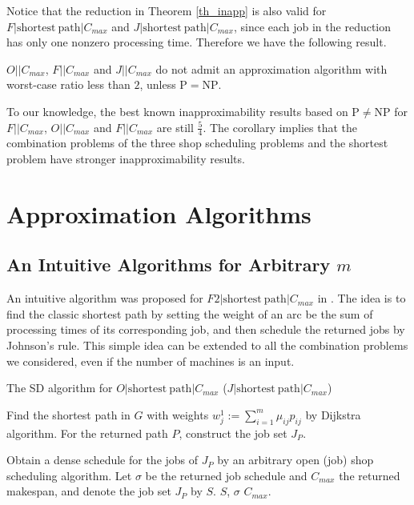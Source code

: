 \documentclass{llncs}
\numberwithin{subcase}{case}
\begin{document}
Notice that the reduction in Theorem \ref{th_inapp} is also valid for $F|\mathrm{shortest}~\mathrm{path}|C_{max}$ and $J|\mathrm{shortest}~\mathrm{path}|C_{max}$, since each job in the reduction has only one nonzero processing time. Therefore we have the following result.
\begin{corollary}
$O||C_{max}$, $F||C_{max}$ and $J||C_{max}$ do not admit an approximation algorithm with worst-case ratio less than $2$, unless $\mathrm{P}=\mathrm{NP}$.
\end{corollary}

To our knowledge, the best known inapproximability results based on $\mathrm{P}\neq\mathrm{NP}$ for $F||C_{max}$, $O||C_{max}$ and $F||C_{max}$ are still $\frac{5}{4}$. The corollary implies that the combination problems of the three shop scheduling problems and the shortest problem have stronger inapproximability results.

\section{Approximation Algorithms}\label{sec_approx}
\subsection{An Intuitive Algorithms for Arbitrary $m$}\label{sec_alg_nat}
An intuitive algorithm was proposed for $F2|\mathrm{shortest}~\mathrm{path}|C_{max}$ in \cite{NW13}. The idea is to find the classic shortest path by setting the weight of an arc be the sum of processing times of its corresponding job, and then schedule the returned jobs by Johnson's rule. This simple idea can be extended to all the combination problems we considered, even if the number of machines is an input.

\begin{algorithm}[htb]
\caption{The SD algorithm for {\small$O|\mathrm{shortest}~\mathrm{path}|C_{max}$ ($J|\mathrm{shortest}~\mathrm{path}|C_{max}$)}}
\label{alg_1}
\begin{algorithmic}[1]
\STATE Find the shortest path in $G$ with weights $w^1_j := \sum^m_{i = 1}\mu_{ij}p_{ij}$ by Dijkstra algorithm. For the returned path $P$, construct the job set $J_P$.

\STATE Obtain a dense schedule for the jobs of $J_P$ by an arbitrary open (job) shop scheduling algorithm. Let $\sigma$  be the returned job schedule and $C_{max}$ the returned makespan, and denote the job set $J_P$ by $S$.
\RETURN $S$, $\sigma$ \AND $C_{max}$.
\end{algorithmic}
\end{algorithm}
\end{document}
